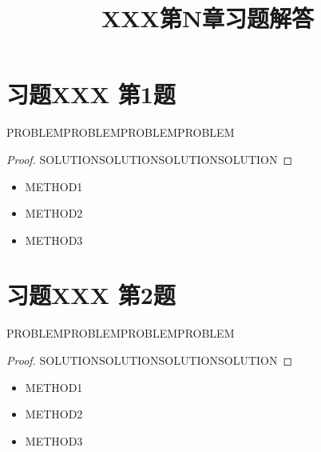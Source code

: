 \documentclass[12pt,a4paper]{article}
\title{XXX第N章习题解答}
\author{}
\date{}
\begin{document}
\maketitle
\tableofcontents
\newpage

\section{习题XXX 第1题}

PROBLEMPROBLEMPROBLEMPROBLEM

\begin{solutionbox}
\begin{proof}
SOLUTIONSOLUTIONSOLUTIONSOLUTION
\end{proof}
\end{solutionbox}

\begin{methodbox}
\begin{itemize}
\item METHOD1

\item METHOD2

\item METHOD3
\end{itemize}
\end{methodbox}

\newpage
\section{习题XXX 第2题}

PROBLEMPROBLEMPROBLEMPROBLEM

\begin{solutionbox}
\begin{proof}
SOLUTIONSOLUTIONSOLUTIONSOLUTION
\end{proof}
\end{solutionbox}

\begin{methodbox}
\begin{itemize}
\item METHOD1

\item METHOD2

\item METHOD3
\end{itemize}
\end{methodbox}
\end{document}
